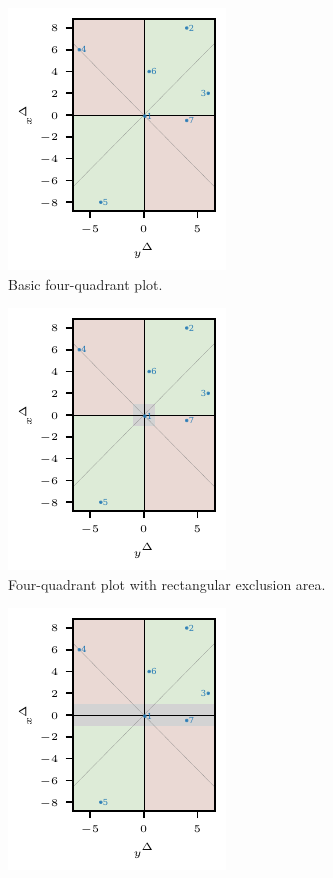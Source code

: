\begin{figure}
\centering
\begin{subfigure}[t]{.24\textwidth}
\includegraphics{plots/illustrative_examples/4Q_without_excl}
\caption{Basic four-quadrant plot.} \label{fig:trending_basic_4q}
\end{subfigure}\hspace{0.01\textwidth}%
\begin{subfigure}[t]{.24\textwidth}
\includegraphics{plots/illustrative_examples/4q_excl_box}
\caption{Four-quadrant plot with rectangular exclusion area.}\label{fig:trending_basic_4q_excl_box}
\end{subfigure}\hspace{0.01\textwidth}%
\begin{subfigure}[t]{.24\textwidth}
\includegraphics{plots/illustrative_examples/4q_excl_axis}

\end{subfigure}
\end{figure}
